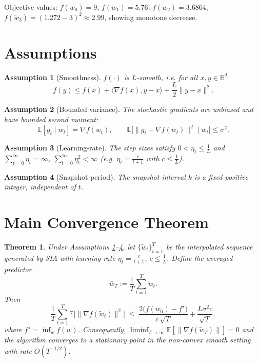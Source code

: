 \documentclass{article}
\newtheorem{theorem}{Theorem}
\newtheorem{assumption}{Assumption}
\newcommand{\E}{\mathbb{E}}
\newcommand{\R}{\mathbb{R}}
\begin{document}
Objective values: $f(w_0)=9$, $f(w_1)=5.76$, $f(w_2)=3.6864$, $f(\tilde w_3)= (1.272-3)^2\approx2.99$, showing monotone decrease.

\newpage
\section*{Assumptions}
\begin{assumption}[Smoothness]\label{ass:smooth}
$f(\cdot)$ is $L$‑smooth, i.e. for all $x,y\in\R^{d}$
\[
    f(y)\le f(x)+\langle\nabla f(x),y-x\rangle+\frac{L}{2}\|y-x\|^{2}.
\]
\end{assumption}
\begin{assumption}[Bounded variance]\label{ass:variance}
The stochastic gradients are unbiased and have bounded second moment:
\[
    \E[g_t\mid w_t]=\nabla f(w_t),\qquad 
    \E\big[\|g_t-\nabla f(w_t)\|^{2}\mid w_t\big]\le\sigma^{2}.
\]
\end{assumption}
\begin{assumption}[Learning‑rate]\label{ass:lr}
The step sizes satisfy $0<\eta_t\le \frac{1}{L}$ and $\sum_{t=0}^{\infty}\eta_t=\infty$, $\sum_{t=0}^{\infty}\eta_t^{2}<\infty$ (e.g. $\eta_t=\frac{c}{t+1}$ with $c\le \frac{1}{L}$).
\end{assumption}
\begin{assumption}[Snapshot period]\label{ass:k}
The snapshot interval $k$ is a fixed positive integer, independent of $t$.
\end{assumption}

\section*{Main Convergence Theorem}
\begin{theorem}\label{thm:main}
Under Assumptions \ref{ass:smooth}–\ref{ass:k}, let $\{\tilde w_t\}_{t=1}^{T}$ be the interpolated sequence generated by SIA with learning‑rate $\eta_t=\frac{c}{t+1}$, $c\le\frac{1}{L}$. Define the averaged predictor
\[
    \bar w_T:=\frac{1}{T}\sum_{t=1}^{T}\tilde w_t .
\]
Then
\[
    \frac{1}{T}\sum_{t=1}^{T}\E\big[\|\nabla f(\tilde w_t)\|^{2}\big]\;\le\;
    \frac{2\big(f(w_0)-f^{\star}\big)}{c\,\sqrt{T}}+\frac{L\sigma^{2}c}{\sqrt{T}},
\]
where $f^{\star}=\inf_{w}f(w)$. Consequently, $\liminf_{T\to\infty}\E[\|\nabla f(\tilde w_T)\|]=0$ and the algorithm converges to a stationary point in the non‑convex smooth setting with rate $O(T^{-1/2})$.
\end{theorem}
\end{document}
